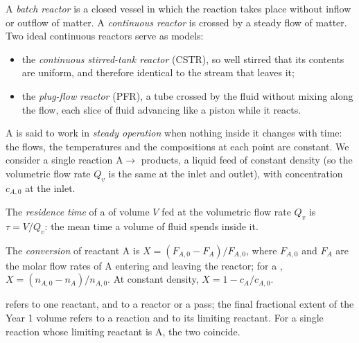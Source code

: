 \begin{definition}\label{def:b2:continuous-reactors:reactors}
A \emph{batch reactor} is a closed vessel in which the
reaction takes place without inflow or outflow of matter. A
\emph{continuous reactor} is crossed by a steady
flow of matter. Two ideal continuous reactors serve as models:
\begin{itemize}
  \item the \emph{continuous stirred-tank reactor}
(CSTR), so well stirred that its contents are
        uniform, and therefore identical to the stream that leaves it;
  \item the \emph{plug-flow reactor} (PFR), a tube
        crossed by the fluid without mixing along the flow, each slice of
        fluid advancing like a piston while it reacts.
\end{itemize}
\end{definition}

A  is said to work in \emph{steady operation} when
nothing inside it changes with time: the flows, the temperatures and the
compositions at each point are constant. We consider a single reaction
$\mathrm A \to$ products, a liquid feed of constant density (so the
volumetric flow rate $Q_v$ is the same at the inlet and outlet), with
concentration $c_{A,0}$ at the inlet.

\begin{definition}\label{def:b2:continuous-reactors:residence-time}
The \emph{residence time} of a  of
volume $V$ fed at the volumetric flow rate $Q_v$ is $\tau = V/Q_v$: the mean
time a volume of fluid spends inside it.
\end{definition}

\begin{definition}[Conversion]\label{def:b2:continuous-reactors:conversion}
The \emph{conversion} of reactant A is $X = (F_{A,0} -
F_A)/F_{A,0}$, where $F_{A,0}$ and $F_A$ are the molar flow rates of A
entering and leaving the reactor; for a , $X = (n_{A,0} -
n_A)/n_{A,0}$. At constant density, $X = 1 - c_A/c_{A,0}$.
\end{definition}

 refers to one reactant, and to a reactor or a pass; the final
fractional extent of the Year 1 volume refers to a reaction and to its
limiting reactant. For a single reaction whose limiting reactant is A, the
two coincide.


